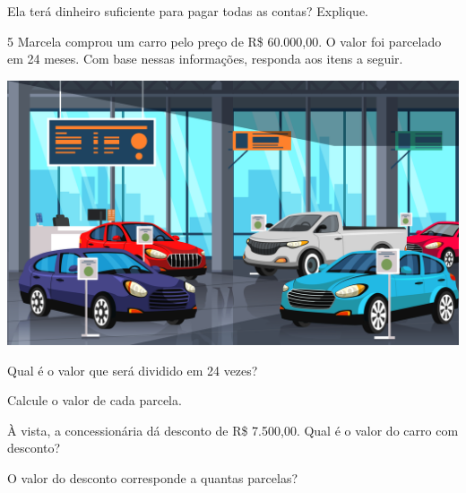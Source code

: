 
Ela terá dinheiro suficiente para pagar todas as contas? Explique.


\num{5} Marcela comprou um carro pelo preço de R\$ 60.000,00.
O valor foi parcelado em 24 meses. Com base nessas informações,
responda aos itens a seguir.

\begin{center}
\includegraphics[width=.7\textwidth]{media/image37b.jpeg}
\end{center}

\begin{escolha}
\item Qual é o valor que será dividido em 24 vezes?

\item Calcule o valor de cada parcela.

\item À vista, a concessionária dá desconto de R\$ 7.500,00.
  Qual é o valor do carro com desconto? 

\item O valor do desconto corresponde a quantas parcelas?
\end{escolha}

